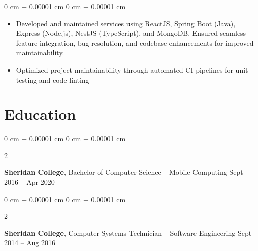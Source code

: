 \documentclass[11pt, letterpaper]{article}
\newenvironment{highlights}{
    \begin{itemize}[
        topsep=0.10 cm,
        parsep=0.10 cm,
        partopsep=0pt,
        itemsep=0pt,
        leftmargin=0 cm + 10pt
    ]
}{
    \end{itemize}
} %
\newenvironment{onecolentry}{
    \begin{adjustwidth}{
        0 cm + 0.00001 cm
    }{
        0 cm + 0.00001 cm
    }
}{
    \end{adjustwidth}
} %
\newenvironment{twocolentry}[2][]{
    \onecolentry
    \def\secondColumn{#2}
    \setcolumnwidth{\fill, 4.5 cm}
    \begin{paracol}{2}
}{
    \switchcolumn \raggedleft \secondColumn
    \end{paracol}
    \endonecolentry
} %
\begin{document}
        \vspace{0.10 cm}
        \begin{onecolentry}
            \begin{highlights}
                \item Developed and maintained services using ReactJS, Spring Boot (Java), Express (Node.js), NestJS (TypeScript), and MongoDB. Ensured seamless feature integration, bug resolution, and codebase enhancements for improved maintainability.
                \item Optimized project maintainability through automated CI pipelines for unit testing and code linting
          \end{highlights}


           
        \end{onecolentry}

    
    \section{Education}



        
        \begin{twocolentry}{
            Sept 2016 – Apr 2020
            
        }
            \textbf{Sheridan College}, Bachelor of Computer Science – Mobile Computing\end{twocolentry}

        \vspace{0.10 cm}

  \begin{twocolentry}{
            Sept 2014 – Aug 2016
        }
            \textbf{Sheridan College}, Computer Systems Technician – Software Engineering\end{twocolentry}

        \vspace{0.10 cm}
\end{document}
